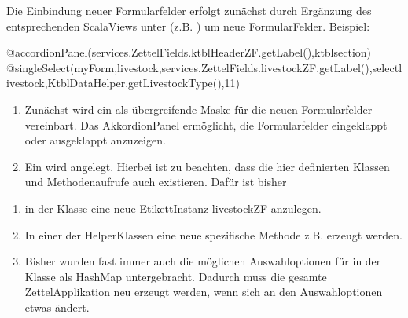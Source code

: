 \documentclass[letterpaper,10pt,ngerman]{sphinxmanual}
\begin{document}
Die Einbindung neuer Formularfelder erfolgt zunächst durch Ergänzung des entsprechenden Scala\sphinxhyphen{}Views unter  (z.B. )
um neue Formular\sphinxhyphen{}Felder. Beispiel:

\begin{sphinxVerbatim}[commandchars=\\\{\}]
@accordionPanel(services.ZettelFields.ktblHeaderZF.getLabel(),\PYGZdq{}ktbl\PYGZhy{}section\PYGZdq{})\PYGZob{}
         
        @singleSelect(myForm,\PYGZdq{}livestock\PYGZdq{},services.ZettelFields.livestockZF.getLabel(),\PYGZdq{}select\PYGZhy{}livestock\PYGZdq{},KtblDataHelper.getLivestockType(),11)
         
\PYGZcb{}
\end{sphinxVerbatim}
\begin{enumerate}
%
\item {} 
Zunächst wird ein  als übergreifende Maske für die neuen Formularfelder vereinbart. Das Akkordion\sphinxhyphen{}Panel ermöglicht, die Formularfelder eingeklappt oder ausgeklappt anzuzeigen.

\item {} 
Ein  wird angelegt. Hierbei ist zu beachten, dass die hier definierten Klassen und Methodenaufrufe auch existieren. Dafür ist bisher

\end{enumerate}
\begin{enumerate}
%
\item {} 
in der Klasse  eine neue Etikett\sphinxhyphen{}Instanz livestockZF anzulegen. 

\item {} 
In einer der Helper\sphinxhyphen{}Klassen eine neue spezifische Methode z.B.  erzeugt werden.

\item {} 
Bisher wurden fast immer auch die möglichen Auswahloptionen für  in der Klasse  als HashMap untergebracht. Dadurch muss die gesamte Zettel\sphinxhyphen{}Applikation neu erzeugt werden, wenn sich an den Auswahloptionen etwas ändert.

\end{enumerate}
\end{document}
